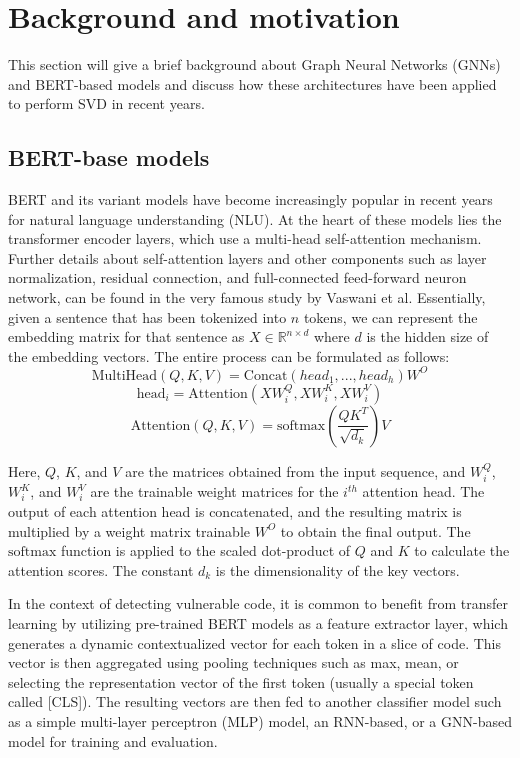 \documentclass{ieeeaccess}
\begin{document}
\section{Background and motivation}
This section will give a brief background about Graph Neural Networks (GNNs) and BERT-based models and discuss how these architectures have been applied to perform SVD in recent years.
\subsection{BERT-base models}
BERT \cite{bert} and its variant models \cite{albert,distilbert}  have become increasingly popular in recent years for natural language understanding (NLU)\cite{bert}. At the heart of these models lies the transformer encoder layers, which use a multi-head self-attention mechanism. Further details about self-attention layers and other components such as layer normalization\cite{layer_norm}, residual connection, and full-connected feed-forward neuron network, can be found in the very famous study\cite{attention} by Vaswani et al. Essentially, given a sentence that has been tokenized into $n$ tokens, we can represent the embedding matrix for that sentence as $X\in \mathbb{R}^{n \times d}$ where $d$ is the hidden size of the embedding vectors. The entire process can be formulated as follows:
\begin{equation}
\text{MultiHead}(Q,K,V) = \text{Concat}(head_1,...,head_h)W^O
\end{equation}
\begin{equation}
\text{head}_i = \text{Attention}(XW_i^Q,XW_i^K,XW_i^V)
\end{equation}
\begin{equation} \label{equa:self_attention}
\text{Attention}(Q,K,V) = \text{softmax}\left(\frac{QK^T}{\sqrt{d_k}}\right)V
\end{equation}

Here, $Q$, $K$, and $V$ are the matrices obtained from the input sequence, and $W_i^Q$, $W_i^K$, and $W_i^V$ are the trainable weight matrices for the $i^{th}$ attention head. The output of each attention head is concatenated, and the resulting matrix is multiplied by a weight matrix trainable $W^O$ to obtain the final output. The $\text{softmax}$ function is applied to the scaled dot-product of $Q$ and $K$ to calculate the attention scores. The constant $d_k$ is the dimensionality of the key vectors.

\par In the context of detecting vulnerable code, it is common to benefit from transfer learning by utilizing pre-trained BERT models \cite{codebert} as a feature extractor layer\cite{Linevd, Embeds_comparison}, which generates a dynamic contextualized vector for each token in a slice of code. This vector is then aggregated using pooling techniques such as max, mean, or selecting the representation vector of the first token (usually a special token called [CLS]). The resulting vectors are then fed to another classifier model such as a simple multi-layer perceptron (MLP) model, an RNN-based\cite{rnn, LSTM, GRU}, or  a GNN-based\cite{GNN, GAT, GCN} model for training and evaluation.
\end{document}
